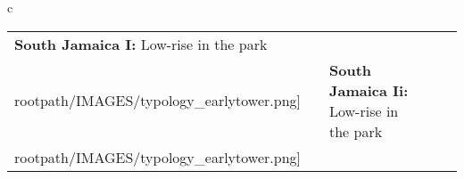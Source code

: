\begin{table}[H]
        \begin{tabular}{c}
        \begin{tabular}{m{1.25in} m{2in} m{.1in} m{1.25in} m{2in}}
\textbf{South Jamaica I:} {Low-rise in the park} & \texttt{[image: \\rootpath/IMAGES/typology\_earlytower.png]} & & \textbf{South Jamaica Ii:} {Low-rise in the park} & \texttt{[image: \\rootpath/IMAGES/typology\_earlytower.png]}
\end{tabular}\end{tabular}
        \end{table}